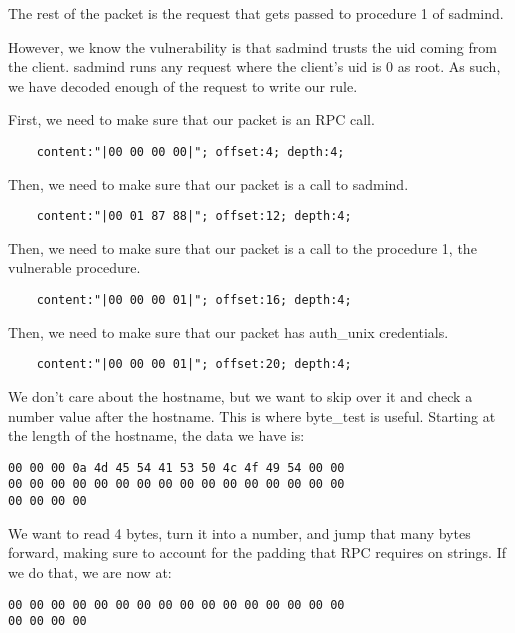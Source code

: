 \documentclass[english]{report}
\begin{document}
The rest of the packet is the request that gets passed to procedure 1 of sadmind.

However, we know the vulnerability is that sadmind trusts the uid coming from the client.  sadmind runs any request where the client's uid is 0 as root.  As such, we have decoded enough of the request to write our rule.  


First, we need to make sure that our packet is an RPC call.
    
\begin{verbatim}
    content:"|00 00 00 00|"; offset:4; depth:4;
\end{verbatim}

Then, we need to make sure that our packet is a call to sadmind.
    
\begin{verbatim}
    content:"|00 01 87 88|"; offset:12; depth:4;
\end{verbatim}

Then, we need to make sure that our packet is a call to the procedure 1, the vulnerable procedure.  
   
\begin{verbatim}
    content:"|00 00 00 01|"; offset:16; depth:4;
\end{verbatim}

Then, we need to make sure that our packet has auth\_unix credentials.  
    
\begin{verbatim}
    content:"|00 00 00 01|"; offset:20; depth:4;
\end{verbatim}

We don't care about the hostname, but we want to skip over it and check a
number value after the hostname.  This is where byte\_test is useful.  Starting
at the length of the hostname, the data we have is:

\begin{verbatim}
00 00 00 0a 4d 45 54 41 53 50 4c 4f 49 54 00 00
00 00 00 00 00 00 00 00 00 00 00 00 00 00 00 00
00 00 00 00
\end{verbatim}

We want to read 4 bytes, turn it into a number, and jump that many bytes
forward, making sure to account for the padding that RPC requires on strings.
If we do that, we are now at:

\begin{verbatim}
00 00 00 00 00 00 00 00 00 00 00 00 00 00 00 00
00 00 00 00 
\end{verbatim}
\end{document}
